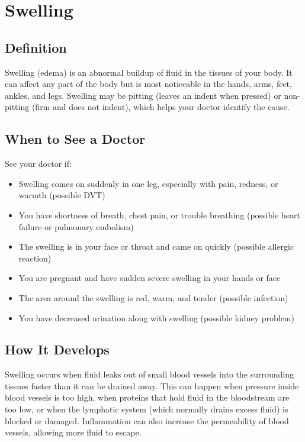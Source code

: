 \chapter{Swelling}

\section*{Definition}
Swelling (edema) is an abnormal buildup of fluid in the tissues of your body. It can affect any part of the body but is most noticeable in the hands, arms, feet, ankles, and legs. Swelling may be pitting (leaves an indent when pressed) or non-pitting (firm and does not indent), which helps your doctor identify the cause.

\section*{When to See a Doctor}
See your doctor if:
\begin{itemize}
  \item Swelling comes on suddenly in one leg, especially with pain, redness, or warmth (possible DVT)
  \item You have shortness of breath, chest pain, or trouble breathing (possible heart failure or pulmonary embolism)
  \item The swelling is in your face or throat and came on quickly (possible allergic reaction)
  \item You are pregnant and have sudden severe swelling in your hands or face
  \item The area around the swelling is red, warm, and tender (possible infection)
  \item You have decreased urination along with swelling (possible kidney problem)
\end{itemize}

\section*{How It Develops}
Swelling occurs when fluid leaks out of small blood vessels into the surrounding tissues faster than it can be drained away. This can happen when pressure inside blood vessels is too high, when proteins that hold fluid in the bloodstream are too low, or when the lymphatic system (which normally drains excess fluid) is blocked or damaged. Inflammation can also increase the permeability of blood vessels, allowing more fluid to escape.

